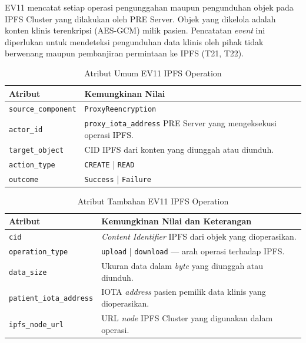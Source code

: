 EV11 mencatat setiap operasi pengunggahan maupun pengunduhan objek pada IPFS
Cluster yang dilakukan oleh PRE Server. Objek yang dikelola adalah konten
klinis terenkripsi (AES-GCM) milik pasien. Pencatatan \textit{event} ini
diperlukan untuk mendeteksi pengunduhan data klinis oleh pihak tidak berwenang
maupun pembanjiran permintaan ke IPFS (T21, T22).

\begin{table}[htbp]
\centering
\caption{Atribut Umum EV11 IPFS Operation}
\label{tab:ev11-umum}
\renewcommand{\arraystretch}{1.3}
\begin{tabular}{|p{3.5cm}|p{8.5cm}|}
\hline
\textbf{Atribut} & \textbf{Kemungkinan Nilai} \\
\hline
\texttt{source\_component} &
\texttt{ProxyReencryption} \\
\hline
\texttt{actor\_id} &
\texttt{proxy\_iota\_address} PRE Server yang mengeksekusi operasi IPFS. \\
\hline
\texttt{target\_object} &
CID IPFS dari konten yang diunggah atau diunduh. \\
\hline
\texttt{action\_type} &
\texttt{CREATE} | \texttt{READ} \\
\hline
\texttt{outcome} &
\texttt{Success} | \texttt{Failure} \\
\hline
\end{tabular}
\end{table}

\begin{table}[htbp]
\centering
\caption{Atribut Tambahan EV11 IPFS Operation}
\label{tab:ev11-detail}
\renewcommand{\arraystretch}{1.3}
\begin{tabular}{|p{4cm}|p{7.5cm}|}
\hline
\textbf{Atribut} & \textbf{Kemungkinan Nilai dan Keterangan} \\
\hline
\texttt{cid} &
\textit{Content Identifier} IPFS dari objek yang dioperasikan. \\
\hline
\texttt{operation\_type} &
\texttt{upload} | \texttt{download} --- arah operasi terhadap IPFS. \\
\hline
\texttt{data\_size} &
Ukuran data dalam \textit{byte} yang diunggah atau diunduh. \\
\hline
\texttt{patient\_iota\_address} &
IOTA \textit{address} pasien pemilik data klinis yang dioperasikan. \\
\hline
\texttt{ipfs\_node\_url} &
URL \textit{node} IPFS Cluster yang digunakan dalam operasi. \\
\hline
\end{tabular}
\end{table}

